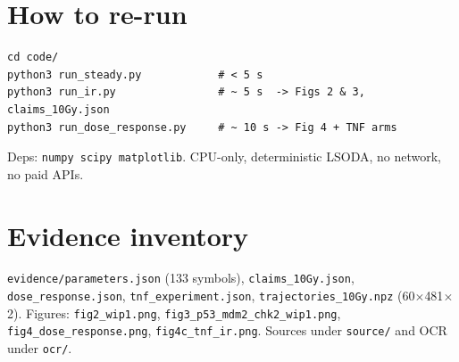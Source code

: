 \documentclass[11pt]{article}
\begin{document}
\section{How to re-run}
\begin{verbatim}
cd code/
python3 run_steady.py            # < 5 s
python3 run_ir.py                # ~ 5 s  -> Figs 2 & 3, claims_10Gy.json
python3 run_dose_response.py     # ~ 10 s -> Fig 4 + TNF arms
\end{verbatim}
Deps: \texttt{numpy scipy matplotlib}. CPU-only, deterministic LSODA, no
network, no paid APIs.

\section{Evidence inventory}
\texttt{evidence/parameters.json} (133 symbols), \texttt{claims\_10Gy.json},
\texttt{dose\_response.json}, \texttt{tnf\_experiment.json},
\texttt{trajectories\_10Gy.npz} (60$\times$481$\times$2). Figures:
\texttt{fig2\_wip1.png}, \texttt{fig3\_p53\_mdm2\_chk2\_wip1.png},
\texttt{fig4\_dose\_response.png}, \texttt{fig4c\_tnf\_ir.png}. Sources under
\texttt{source/} and OCR under \texttt{ocr/}.


\end{document}
